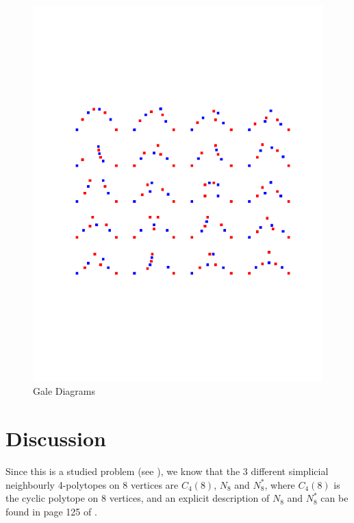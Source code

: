 \documentclass[paper=a4, fontsize=11pt]{scrartcl} %
\theoremstyle{definition}
\begin{document}
\begin{figure}[!htb]
\centering
\includegraphics[scale=0.8]{gale_diagrams.pdf}
\caption{Gale Diagrams}
\label{fig:gale}
\end{figure}

\section{Discussion}
Since this is a studied problem (see \cite{GrSr67}), we know that the 3 different simplicial neighbourly 4-polytopes on 8 vertices are $C_4(8)$, $N_8$ and $N_8^*$, where $C_4(8)$ is the cyclic polytope on 8 vertices, and an explicit description of $N_8$ and $N_8^*$ can be found in page 125 of \cite{Gr03}.


\end{document}
